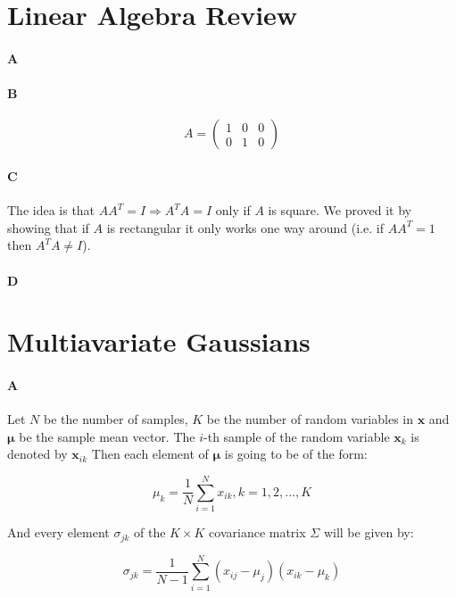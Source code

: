 \documentclass[12pt]{article}
\begin{document}
\maketitle

\section{Linear Algebra Review}

\paragraph{A}

\paragraph{B}
\begin{equation}
A = \left( \begin{array}{ccc} 1 & 0 & 0 \\ 0 & 1 & 0 \end{array} \right)
\end{equation}

\paragraph{C}
The idea is that $AA^T = I \Rightarrow A^TA=I$ only if $A$ is square. We proved it by showing that if $A$ is rectangular it only works one way around (i.e. if $AA^T=1$ then $A^TA \neq I$).

\paragraph{D}

\section{Multiavariate Gaussians}

\paragraph{A}
Let $N$ be the number of samples, $K$ be the number of random variables in $\mathbf{x}$ and $\mathbf{\mu}$ be the sample mean vector. The $i$-th sample of the random variable $\mathbf{x}_k$ is denoted by $\mathbf{x}_{ik}$ Then each element of $\mathbf{\mu}$ is going to be of the form:

\begin{equation}
\mu_k = \frac{1}{N}\displaystyle\sum_{i=1}^{N}{x_{ik}}, k=1,2,...,K
\end{equation}

And every element $\sigma_{jk}$ of the $K \times K$ covariance matrix $\Sigma$ will be given by:

\begin{equation}
\sigma_{jk}=\frac{1}{N-1}\displaystyle\sum_{i=1}^{N}{(x_{ij}-\mu_j)(x_{ik}-\mu_{k})}
\end{equation}
\end{document}
